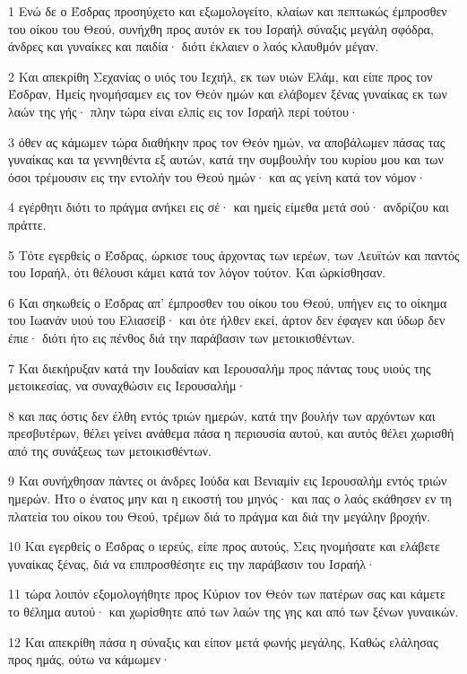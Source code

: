 \par 1 Ενώ δε ο Έσδρας προσηύχετο και εξωμολογείτο, κλαίων και πεπτωκώς έμπροσθεν του οίκου του Θεού, συνήχθη προς αυτόν εκ του Ισραήλ σύναξις μεγάλη σφόδρα, άνδρες και γυναίκες και παιδία· διότι έκλαιεν ο λαός κλαυθμόν μέγαν.
\par 2 Και απεκρίθη Σεχανίας ο υιός του Ιεχιήλ, εκ των υιών Ελάμ, και είπε προς τον Έσδραν, Ημείς ηνομήσαμεν εις τον Θεόν ημών και ελάβομεν ξένας γυναίκας εκ των λαών της γής· πλην τώρα είναι ελπίς εις τον Ισραήλ περί τούτου·
\par 3 όθεν ας κάμωμεν τώρα διαθήκην προς τον Θεόν ημών, να αποβάλωμεν πάσας τας γυναίκας και τα γεννηθέντα εξ αυτών, κατά την συμβουλήν του κυρίου μου και των όσοι τρέμουσιν εις την εντολήν του Θεού ημών· και ας γείνη κατά τον νόμον·
\par 4 εγέρθητι διότι το πράγμα ανήκει εις σέ· και ημείς είμεθα μετά σού· ανδρίζου και πράττε.
\par 5 Τότε εγερθείς ο Έσδρας, ώρκισε τους άρχοντας των ιερέων, των Λευϊτών και παντός του Ισραήλ, ότι θέλουσι κάμει κατά τον λόγον τούτον. Και ώρκίσθησαν.
\par 6 Και σηκωθείς ο Έσδρας απ' έμπροσθεν του οίκου του Θεού, υπήγεν εις το οίκημα του Ιωανάν υιού του Ελιασείβ· και ότε ήλθεν εκεί, άρτον δεν έφαγεν και ύδωρ δεν έπιε· διότι ήτο εις πένθος διά την παράβασιν των μετοικισθέντων.
\par 7 Και διεκήρυξαν κατά την Ιουδαίαν και Ιερουσαλήμ προς πάντας τους υιούς της μετοικεσίας, να συναχθώσιν εις Ιερουσαλήμ·
\par 8 και πας όστις δεν έλθη εντός τριών ημερών, κατά την βουλήν των αρχόντων και πρεσβυτέρων, θέλει γείνει ανάθεμα πάσα η περιουσία αυτού, και αυτός θέλει χωρισθή από της συνάξεως των μετοικισθέντων.
\par 9 Και συνήχθησαν πάντες οι άνδρες Ιούδα και Βενιαμίν εις Ιερουσαλήμ εντός τριών ημερών. Ήτο ο ένατος μην και η εικοστή του μηνός· και πας ο λαός εκάθησεν εν τη πλατεία του οίκου του Θεού, τρέμων διά το πράγμα και διά την μεγάλην βροχήν.
\par 10 Και εγερθείς ο Έσδρας ο ιερεύς, είπε προς αυτούς, Σεις ηνομήσατε και ελάβετε γυναίκας ξένας, διά να επιπροσθέσητε εις την παράβασιν του Ισραήλ·
\par 11 τώρα λοιπόν εξομολογήθητε προς Κύριον τον Θεόν των πατέρων σας και κάμετε το θέλημα αυτού· και χωρίσθητε από των λαών της γης και από των ξένων γυναικών.
\par 12 Και απεκρίθη πάσα η σύναξις και είπον μετά φωνής μεγάλης, Καθώς ελάλησας προς ημάς, ούτω να κάμωμεν·
